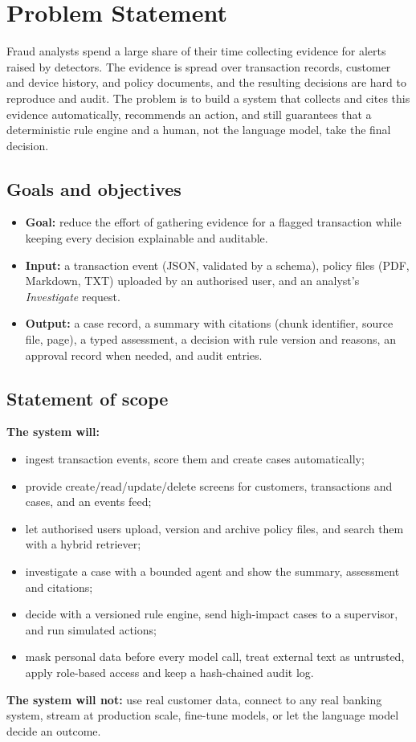 \documentclass[oneside,a4paper,12pt]{report}
\begin{document}
\section{Problem Statement}
Fraud analysts spend a large share of their time collecting evidence for alerts raised by detectors. The evidence is spread over transaction records, customer and device history, and policy documents, and the resulting decisions are hard to reproduce and audit. The problem is to build a system that collects and cites this evidence automatically, recommends an action, and still guarantees that a deterministic rule engine and a human, not the language model, take the final decision.

\subsection{Goals and objectives}
\begin{itemize}
  \item \textbf{Goal:} reduce the effort of gathering evidence for a flagged transaction while keeping every decision explainable and auditable.
  \item \textbf{Input:} a transaction event (JSON, validated by a schema), policy files (PDF, Markdown, TXT) uploaded by an authorised user, and an analyst's \emph{Investigate} request.
  \item \textbf{Output:} a case record, a summary with citations (chunk identifier, source file, page), a typed assessment, a decision with rule version and reasons, an approval record when needed, and audit entries.
\end{itemize}

\subsection{Statement of scope}
\textbf{The system will:}
\begin{itemize}
  \item ingest transaction events, score them and create cases automatically;
  \item provide create/read/update/delete screens for customers, transactions and cases, and an events feed;
  \item let authorised users upload, version and archive policy files, and search them with a hybrid retriever;
  \item investigate a case with a bounded agent and show the summary, assessment and citations;
  \item decide with a versioned rule engine, send high-impact cases to a supervisor, and run simulated actions;
  \item mask personal data before every model call, treat external text as untrusted, apply role-based access and keep a hash-chained audit log.
\end{itemize}
\textbf{The system will not:} use real customer data, connect to any real banking system, stream at production scale, fine-tune models, or let the language model decide an outcome.
\end{document}
